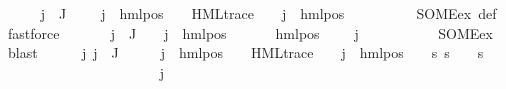 \begin{isabellebody}
\ \ \ \ \isamarkupfalse%
\ {\isachardoublequoteopen}{\isasymforall}j\ {\isasymin}\ J{\isachardot}{\kern0pt}\ {\isasymexists}{\isasymalpha}\ {\isasympsi}\ {\isasymphi}{\isachardot}{\kern0pt}\ {\isasymPsi}\ j\ {\isacharequal}{\kern0pt}\ hml{\isacharunderscore}{\kern0pt}pos\ {\isasymalpha}\ {\isasympsi}\ {\isasymand}\ HML{\isacharunderscore}{\kern0pt}trace\ {\isasympsi}\ {\isasymand}\ {\isasymPhi}\ j\ {\isacharequal}{\kern0pt}\ hml{\isacharunderscore}{\kern0pt}pos\ {\isasymalpha}\ {\isasymphi}{\isachardoublequoteclose}\isanewline
\ \ \ \ \ \ \isamarkupfalse%
\ SOME{\isacharunderscore}{\kern0pt}ex\ {\isasymPsi}{\isacharunderscore}{\kern0pt}def\ \isamarkupfalse%
\ fastforce\ \isanewline
\ \ \ \ \isamarkupfalse%
\ {\isachardoublequoteopen}{\isasymforall}j\ {\isasymin}\ J{\isachardot}{\kern0pt}\ {\isasymexists}{\isasymalpha}\ {\isasymphi}{\isachardot}{\kern0pt}\ {\isasymPhi}\ j\ {\isacharequal}{\kern0pt}\ hml{\isacharunderscore}{\kern0pt}pos\ {\isasymalpha}\ {\isasymphi}\ {\isasymand}\ {\isacharparenleft}{\kern0pt}{\isasymforall}{\isasympsi}{\isachardot}{\kern0pt}\ {\isasympsi}\ {\isasymnoteq}\ {\isacharparenleft}{\kern0pt}hml{\isacharunderscore}{\kern0pt}pos\ {\isasymalpha}\ {\isasymphi}{\isacharparenright}{\kern0pt}\ {\isasymlongrightarrow}\ {\isasymPhi}\ j\ {\isasymnoteq}\ {\isasympsi}{\isacharparenright}{\kern0pt}{\isachardoublequoteclose}\ \isanewline
\ \ \ \ \ \ \isamarkupfalse%
\ SOME{\isacharunderscore}{\kern0pt}ex\ \isamarkupfalse%
\ blast\isanewline
\isanewline
\ \ \ \ \isamarkupfalse%
\ {\isachardoublequoteopen}{\isasymAnd}j{\isachardot}{\kern0pt}\ j\ {\isasymin}\ J\ {\isasymLongrightarrow}\ {\isasymexists}{\isasymalpha}\ {\isasympsi}\ {\isasymphi}{\isachardot}{\kern0pt}\ {\isasymPsi}\ j\ {\isacharequal}{\kern0pt}\ hml{\isacharunderscore}{\kern0pt}pos\ {\isasymalpha}\ {\isasympsi}\ {\isasymand}\ HML{\isacharunderscore}{\kern0pt}trace\ {\isasympsi}\ {\isasymand}\ {\isasymPhi}\ j\ {\isacharequal}{\kern0pt}\ hml{\isacharunderscore}{\kern0pt}pos\ {\isasymalpha}\ {\isasymphi}\ {\isasymand}\ {\isacharparenleft}{\kern0pt}{\isasymforall}s{\isachardot}{\kern0pt}\ s\ {\isasymTurnstile}\ {\isasymphi}\ {\isasymlongleftrightarrow}\ s\ {\isasymTurnstile}\ {\isasympsi}{\isacharparenright}{\kern0pt}{\isachardoublequoteclose}\isanewline
\ \ \ \ \isamarkupfalse%
\ {\isacharminus}{\kern0pt}\isanewline
\ \ \ \ \ \ \isacommand{{\isacharbraceleft}{\kern0pt}}\isamarkupfalse%
\isanewline
\ \ \ \ \ \ \ \ \isamarkupfalse%
\ j\ \isamarkupfalse%

\end{isabellebody}
